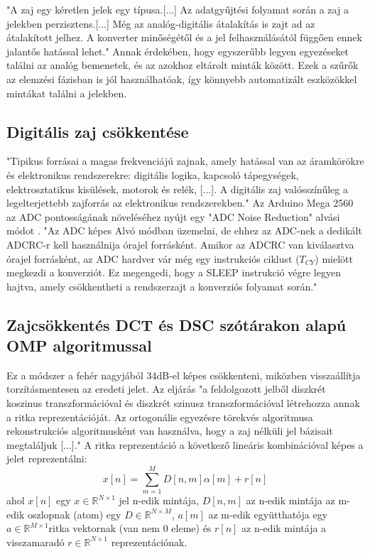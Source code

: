 "A zaj egy kéretlen jelek egy típusa.[...] Az adatgyűjtési folyamat során a zaj a jelekben perzisztens.[...] 
Még az analóg-digitális átalakítás is zajt ad az átalakított jelhez. 
A konverter minőségétől és a jel felhasználásától függően ennek jalantős hatással lehet."\cite{noise_reduction_omp}
Annak érdekében, hogy egyszerűbb legyen egyezéseket találni az analóg bemenetek, és az azokhoz eltárolt minták között.
Ezek a szűrők az elemzési fázisban is jól használhatóak, így könnyebb automatizált eszközökkel mintákat találni a jelekben.

\subsection{Digitális zaj csökkentése}
"Tipikus forrásai a magas frekvenciájú zajnak, amely hatással van az áramkörökre és elektronikus rendszerekre: digitális logika, kapcsoló tápegységek, elektrosztatikus kisülések, motorok és relék, [...]. 
A digitális zaj valósszínűleg a legelterjettebb zajforrás az elektronikus rendszerekben."\cite{smith1992high}
Az Arduino Mega 2560 az ADC pontosságának növeléséhez nyújt egy "ADC Noise Reduction" alvási módot \cite{arduino_at_mega_datasheet}. 
"Az ADC képes Alvó módban üzemelni, de ehhez az ADC-nek a dedikált ADCRC-r kell használnija órajel forrásként. 
Amikor az ADCRC van kiválasztva órajel forrásként, az ADC hardver vár még egy instrukciós ciklust ($T_{CY}$) mielött megkezdi a konverziót. 
Ez megengedi, hogy a SLEEP instrukció végre legyen hajtva, amely csökkentheti a rendszerzajt a konverziós folyamat során."\cite{ATmega_processor_datasheet}

\subsection{Zajcsökkentés DCT és DSC szótárakon alapú OMP algoritmussal}

Ez a módszer a fehér nagyjából 34dB-el képes csökkenteni, miközben visszaállítja torzításmentesen az eredeti jelet.\cite{noise_reduction_omp}
Az eljárás "a feldolgozott jelből diszkrét koszinus transzformációval és diszkrét szinusz transzformációval létrehozza annak a ritka reprezentációját. Az ortogonális egyezésre törekvés algoritmusa rekonstrukciós algoritmusként van használva, hogy a zaj nélküli jel bázisait megtaláljuk [...]."\cite{noise_reduction_omp}
A ritka reprezentáció a következő lineáris kombinációval képes a jelet reprezentálni:
\[x[n]=\sum_{m=1}^{M}D[n,m]\alpha[m]+r[n]\]
ahol $x[n]$ egy $x \in \mathbb{R}^{N \times 1}$ jel n-edik mintája, $D[n,m]$ az n-edik mintája az m-edik oszlopnak (atom) egy $D \in \mathbb{R}^{N \times M}$, $a[m]$ az m-edik együtthatója egy $a \in \mathbb{R}^{M \times 1}$ritka vektornak (van nem 0 eleme) és $r[n]$ az n-edik mintája a visszamaradó $r \in \mathbb{R}^{N \times 1}$ reprezentációnak.\cite{noise_reduction_omp}

